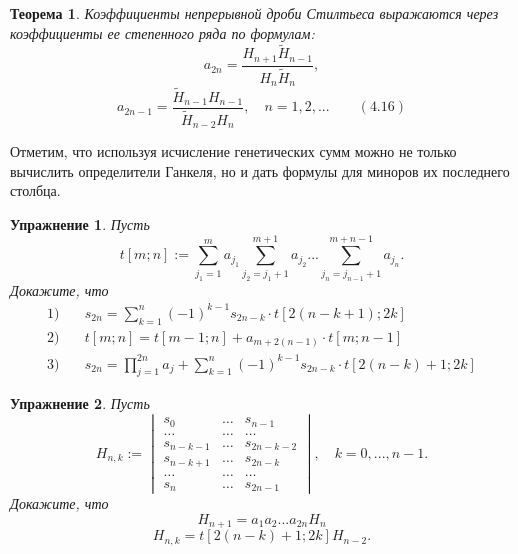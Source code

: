 \documentclass[12 pt, a4 paper]{article}
\theoremstyle{plain}   \newtheorem{Pro}{Задача}
\newtheorem{The}{Теорема}
\newtheorem{Exe}{Упражнение}
\begin{document}
\begin{The}
Коэффициенты непрерывной дроби Стилтьеса выражаются через
коэффициенты ее степенного ряда по формулам:
$$
  a_{2n}=\frac{H_{n+1}\tilde H_{n-1}}
    {H_n \tilde H_n},
$$
$$
  a_{2n-1}=\frac{\tilde H_{n-1}H_{n-1}}
    {\tilde H_{n-2}H_n},
	  \quad n=1,2,... \qquad (4.16)
$$
\end{The}
Отметим, что используя исчисление генетических сумм
можно не только вычислить определители Ганкеля, но и
дать формулы для миноров их последнего столбца.
\begin{Exe}
Пусть
\begin{equation*}
  t[m;n]:=
    \sum _{j_1 =1}^m a_{j_1}
	  \sum _{j_2 =j_1 +1}^{m+1}a_{j_2}...
	    \sum _{j_n =j_{n-1}+1}^{m+n-1}a_{j_n}.
\end{equation*}
Докажите, что
\begin{align*}
  1) & \quad
    s_{2n}=\sum _{k=1}^n (-1)^{k-1}s_{2n-k} \cdot
	  t[2(n-k+1);2k] \\
  2) & \quad
    t[m;n]=t[m-1;n]+a_{m+2(n-1)}
	  \cdot t[m;n-1] \\
  3) & \quad
    s_{2n}= \prod _{j=1}^{2n}a_j +
	  \sum _{k=1}^n (-1)^{k-1}s_{2n-k} \cdot
	    t[2(n-k)+1;2k]
\end{align*}
\end{Exe}
\begin{Exe}
Пусть
\begin{equation*}
  H_{n,k}:=
    \begin{vmatrix}
	  s_0 & \dots & s_{n-1} \\
	  \dots & \dots & \dots \\
	  s_{n-k-1} & \dots & s_{2n-k-2} \\
	  s_{n-k+1} & \dots & s_{2n-k} \\
	  \dots & \dots & \dots \\
	  s_n & \dots & s_{2n-1}
	\end{vmatrix}
  , \quad k=0,...,n-1.
\end{equation*}
Докажите, что
$$
  H_{n+1}=a_1 a_2 ...a_{2n} H_n
$$
$$
  H_{n,k}=t[2(n-k)+1;2k]H_{n-2}.
$$
\end{Exe}
\newpage
\end{document}
